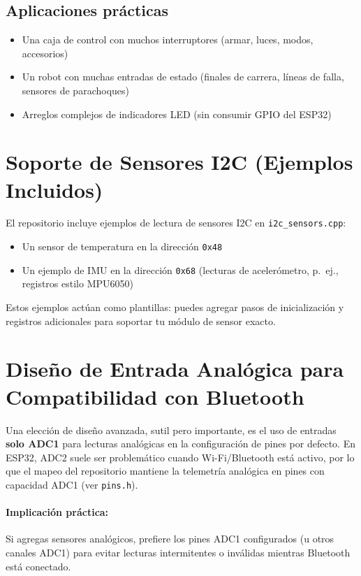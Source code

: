 \subsection{Aplicaciones prácticas}
\begin{itemize}
    \item Una caja de control con muchos interruptores (armar, luces, modos, accesorios)
    \item Un robot con muchas entradas de estado (finales de carrera, líneas de falla, sensores de parachoques)
    \item Arreglos complejos de indicadores LED (sin consumir GPIO del ESP32)
\end{itemize}

\section{Soporte de Sensores I2C (Ejemplos Incluidos)}
\label{sec:i2c-sensors}

El repositorio incluye ejemplos de lectura de sensores I2C en \texttt{i2c\_sensors.cpp}:

\begin{itemize}
    \item Un sensor de temperatura en la dirección \texttt{0x48}
    \item Un ejemplo de IMU en la dirección \texttt{0x68} (lecturas de acelerómetro, p.\ ej., registros estilo MPU6050)
\end{itemize}

Estos ejemplos actúan como plantillas: puedes agregar pasos de inicialización y registros adicionales para soportar
tu módulo de sensor exacto.

\section{Diseño de Entrada Analógica para Compatibilidad con Bluetooth}
\label{sec:adc1}

Una elección de diseño avanzada, sutil pero importante, es el uso de entradas \textbf{solo ADC1} para lecturas analógicas
en la configuración de pines por defecto. En ESP32, ADC2 suele ser problemático cuando Wi-Fi/Bluetooth está activo,
por lo que el mapeo del repositorio mantiene la telemetría analógica en pines con capacidad ADC1 (ver \texttt{pins.h}).

\paragraph{Implicación práctica:}
Si agregas sensores analógicos, prefiere los pines ADC1 configurados (u otros canales ADC1) para evitar lecturas intermitentes
o inválidas mientras Bluetooth está conectado.


